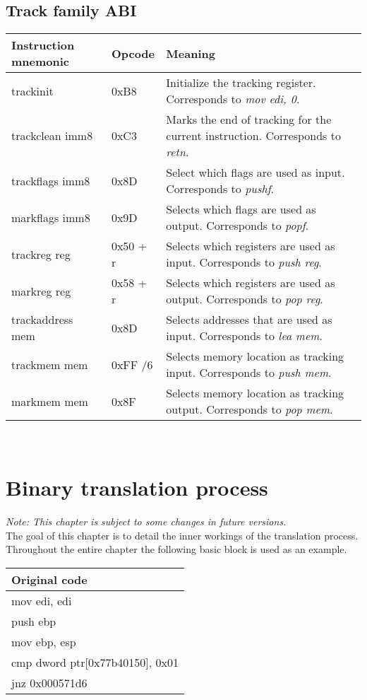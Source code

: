 \documentclass[12pt]{report}
\begin{document}
\section{Track family ABI}
\label{sec:track-family-abi}
\begin{tabular}{| l | l | p{10cm} |}
	\hline
	\textbf{Instruction mnemonic} &	\textbf{Opcode} & \textbf{Meaning}\\ \hline
	trackinit & 0xB8 & Initialize the tracking register. Corresponds to \textit{mov edi, 0}.\\ \hline
	trackclean imm8 & 0xC3 & Marks the end of tracking for the current instruction. Corresponds to \textit{retn}.\\ \hline
	trackflags imm8 & 0x8D & Select which flags are used as input. Corresponds to \textit{pushf}.\\ \hline
	markflags imm8 & 0x9D & Selects which flags are used as output. Corresponds to \textit{popf}.\\ \hline
	trackreg reg & 0x50 + r & Selects which registers are used as input. Corresponds to \textit{push reg}.\\ \hline
	markreg reg & 0x58 + r & Selects which registers are used as output. Corresponds to \textit{pop reg}.\\ \hline
	trackaddress mem & 0x8D & Selects addresses that are used as input. Corresponds to \textit{lea mem}.\\ \hline
	trackmem mem & 0xFF /6 & Selects memory location as tracking input. Corresponds to \textit{push mem}.\\ \hline
	markmem mem & 0x8F & Selects memory location as tracking output. Corresponds to \textit{pop mem}.\\ \hline
\end{tabular}\\

\chapter{Binary translation process}
\label{chapter:binary-translation-process}
\textit{Note: This chapter is subject to some changes in future versions.}\\
The goal of this chapter is to detail the inner workings of the translation process. Throughout the entire chapter the following basic block is used as an example.\\
\newline
\begin{tabular}{| l |}
	\hline
	\textbf{Original code}\\ \hline
	mov edi, edi\\
	push ebp\\
	mov ebp, esp\\
	cmp dword ptr[0x77b40150], 0x01\\
	jnz 0x000571d6\\ \hline
\end{tabular}
\end{document}
